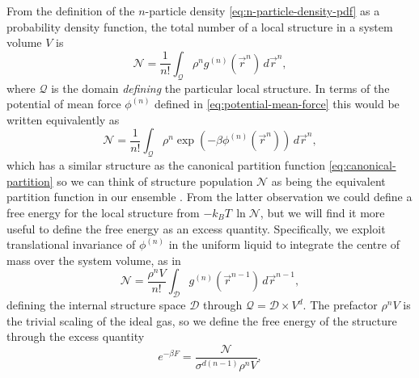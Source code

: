 \documentclass[11pt,twoside]{report}
\begin{document}
From the definition of the $n$-particle density \eqref{eq:n-particle-density-pdf} as a probability density function, the total number of a local structure in a system volume $V$ is
\begin{equation}\label{eq:structure-population}
  \mathcal{N}
  =
  \frac{1}{n!}
  \int_{\mathcal{Q}}
  \rho^n g^{(n)}(\vec{r}^n)
  \, d\vec{r}^n,
\end{equation}
where $\mathcal{Q}$ is the domain \emph{defining} the particular local structure.
In terms of the potential of mean force $\phi^{(n)}$ defined in \eqref{eq:potential-mean-force} this would be written equivalently as
\begin{equation*}
  \mathcal{N}
  =
  \frac{1}{n!}
  \int_{\mathcal{Q}}
  \rho^n \exp{\left(-\beta\phi^{(n)}(\vec{r}^n)\right)}
  \, d\vec{r}^n,
\end{equation*}
which has a similar structure as the canonical partition function \eqref{eq:canonical-partition} so we can think of structure population $\mathcal{N}$ as being the equivalent partition function in our ensemble%
.
From the latter observation we could define a free energy for the local structure from $-k_B T \, \ln{\mathcal{N}}$,
but we will find it more useful to define the free energy as an excess quantity.
Specifically, we exploit translational invariance of $\phi^{(n)}$ in the uniform liquid to integrate the centre of mass over the system volume, as in
\begin{equation}
  \mathcal{N}
  =
  \frac{\rho^n V}{n!}
  \int_\mathcal{D}
  g^{(n)}(\vec{r}^{n-1})
  \, d\vec{r}^{n-1},
\end{equation}
defining the internal structure space $\mathcal{D}$ through $\mathcal{Q} = \mathcal{D} \times V^d$.
The prefactor $\rho^n V$ is the trivial scaling of the ideal gas, so we define the free energy of the structure through the excess quantity%
\begin{equation*}
  e^{-\beta F}
  =
  \frac{\mathcal{N}}{\sigma^{d(n-1)} \rho^n V},
\end{equation*}
\end{document}
